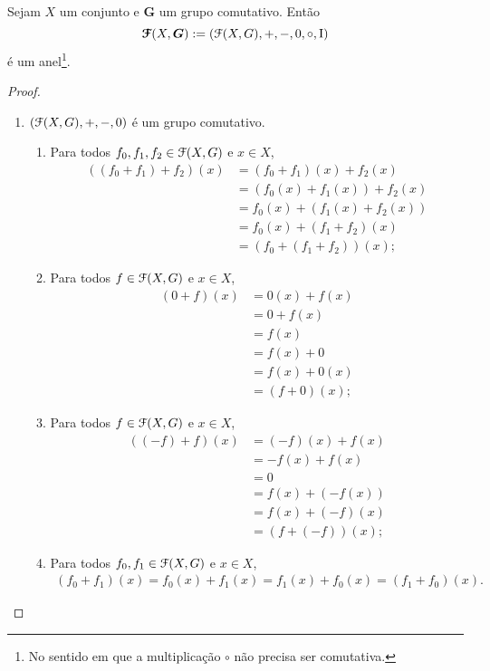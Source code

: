 \begin{proposition}
Sejam $X$ um conjunto e $\bm G$ um grupo comutativo. Então
	\begin{equation*}
	\bm{\mathcal{F}}(X,\bm G) := (\mathcal{F}(X,G),+,-,0,\circ,\mathrm{I})
	\end{equation*}
é um anel\footnote{No sentido em que a multiplicação $\circ$ não precisa ser comutativa.}.
\end{proposition}
\begin{proof}
	\begin{enumerate}
	\item $(\mathcal{F}(X,G),+,-,0)$ é um grupo comutativo.
		\begin{enumerate}
		\item Para todos $f_0,f_1,f_2 \in \mathcal{F}(X,G)$ e $x \in X$,
			\begin{align*}
			((f_0+f_1)+f_2)(x) &= (f_0+f_1)(x)+f_2(x) \\
				&= (f_0(x)+f_1(x))+f_2(x) \\
				&= f_0(x)+(f_1(x)+f_2(x)) \\
				&= f_0(x)+(f_1+f_2)(x) \\
				&= (f_0+(f_1+f_2))(x);
			\end{align*}
		\item Para todos $f \in \mathcal{F}(X,G)$ e $x \in X$,
			\begin{align*}
			(0+f)(x) &= 0(x)+f(x) \\
				&= 0+f(x) \\
				&= f(x) \\
				&= f(x)+0 \\
				&= f(x)+0(x) \\
				&= (f+0)(x);
			\end{align*}
		\item Para todos $f \in \mathcal{F}(X,G)$ e $x \in X$,
			\begin{align*}
			((-f)+f)(x) &= (-f)(x)+f(x) \\
				&= -f(x)+f(x) \\
				&= 0 \\
				&= f(x)+(-f(x)) \\
				&= f(x) + (-f)(x) \\
				&= (f+(-f))(x);
			\end{align*}
		\item Para todos $f_0,f_1 \in \mathcal{F}(X,G)$ e $x \in X$,
			\begin{align*}
			(f_0+f_1)(x) = f_0(x)+f_1(x) = f_1(x) + f_0(x) = (f_1+f_0)(x).
			\end{align*}
		\end{enumerate}


\end{enumerate}
\end{proof}
